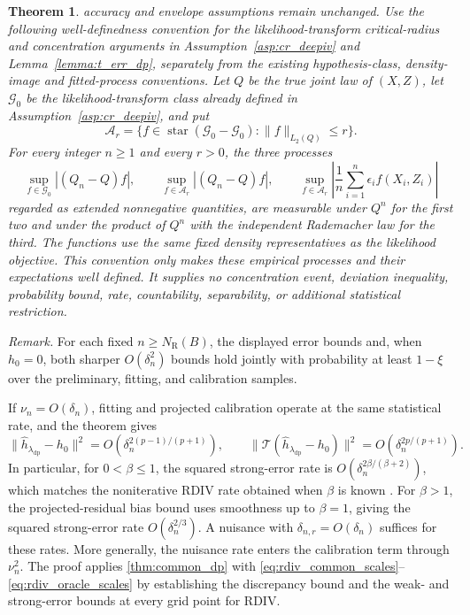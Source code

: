 \documentclass[12pt]{article}
\theoremstyle{plain}
\newtheorem{theorem}{Theorem}[section]
\theoremstyle{definition}
\theoremstyle{remark}
\begin{document}
\begin{theorem}
accuracy and envelope assumptions remain unchanged. Use the following well-definedness convention for the likelihood-transform critical-radius and concentration arguments in Assumption~\ref{asp:cr_deepiv} and Lemma~\ref{lemma:t_err_dp}, separately from the existing hypothesis-class, density-image and fitted-process conventions. Let $Q$ be the true joint law of $(X,Z)$, let $\mathcal G_0$ be the likelihood-transform class already defined in Assumption~\ref{asp:cr_deepiv}, and put \[ \mathcal A_r=\{f\in\operatorname{star}(\mathcal G_0-\mathcal G_0):\|f\|_{L_2(Q)}\leqslant r\}. \] For every integer $n\geqslant1$ and every $r>0$, the three processes \[ \sup_{f\in\mathcal G_0}|(Q_n-Q)f|,\qquad \sup_{f\in\mathcal A_r}|(Q_n-Q)f|,\qquad \sup_{f\in\mathcal A_r}\left|\frac1n\sum_{i=1}^n\epsilon_i f(X_i,Z_i)\right| \] regarded as extended nonnegative quantities, are measurable under $Q^n$ for the first two and under the product of $Q^n$ with the independent Rademacher law for the third. The functions use the same fixed density representatives as the likelihood objective. This convention only makes these empirical processes and their expectations well defined. It supplies no concentration event, deviation inequality, probability bound, rate, countability, separability, or additional statistical restriction.
\end{theorem}

\noindent\textit{Remark.} For each fixed $n\geqslant N_{\mathrm R}(B)$, the displayed error bounds and, when $h_0=0$, both sharper $O(\delta_n^2)$ bounds hold jointly with probability at least $1-\xi$ over the preliminary, fitting, and calibration samples.


If $\nu_n=O(\delta_n)$, fitting and projected calibration operate at the same statistical rate, and the theorem gives
\[
\|\hat h_{\lambda_{\mathrm{dp}}}-h_0\|^2
=O\!\left(\delta_n^{2(p-1)/(p+1)}\right),
\qquad
\|\mathcal T(\hat h_{\lambda_{\mathrm{dp}}}-h_0)\|^2
=O\!\left(\delta_n^{2p/(p+1)}\right).
\]
In particular, for $0<\beta\leqslant1$, the squared strong-error rate is $O(\delta_n^{2\beta/(\beta+2)})$, which matches the noniterative RDIV rate obtained when $\beta$ is known \citep[Theorem~7]{li2024regularized}. For $\beta>1$, the projected-residual bias bound uses smoothness up to $\beta=1$, giving the squared strong-error rate $O(\delta_n^{2/3})$. A nuisance with $\delta_{n,r}=O(\delta_n)$ suffices for these rates. More generally, the nuisance rate enters the calibration term through $\nu_n^2$. The proof applies \cref{thm:common_dp} with \eqref{eq:rdiv_common_scales}--\eqref{eq:rdiv_oracle_scales} by establishing the discrepancy bound and the weak- and strong-error bounds at every grid point for RDIV.
\end{document}
